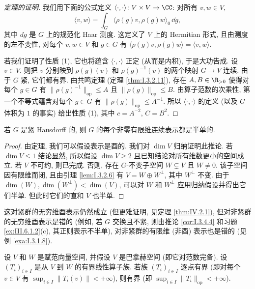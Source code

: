 \begin{proof}[定理的证明]
我们用下面的公式定义 $\langle \cdot, \cdot \rangle \colon V \times V \to \CC$: 对所有 $v, w \in V$,
\[
\langle v, w \rangle = \int_G \langle \rho(g)v, \rho(g)w \rangle_0 \,\dd g,
\]
其中 $dg$ 是 $G$ 上的规范化 Haar 测度. 这定义了 $V$ 上的 Hermitian 形式, 且由测度的左不变性, 对每个 $v, w \in V$ 和 $g \in G$ 有 $\langle \rho(g)v, \rho(g)w \rangle = \langle v, w \rangle$.

若我们证明了性质 (1), 它也将蕴含 $\langle \cdot, \cdot \rangle$ 正定 (从而是内积), 于是大功告成. 设 $v \in V$. 则把 $v$ 分别映到 $\rho(g)(v)$ 和 $\rho(g)^{-1}(v)$ 的两个映射 $G \to V$ 连续. 由于 $G$ 紧, 它们都有界. 由共鸣定理 (定理 \ref{thm:I.3.2.11}), 存在 $A, B \in \R_{>0}$ 使得对每个 $g \in G$ 有 $\|\rho(g)^{-1}\|_{\mathrm{op}} \leq A$ 且 $\|\rho(g)\|_{\mathrm{op}} \leq B$. 由算子范数的次乘性, 第一个不等式蕴含对每个 $g \in G$ 有 $\|\rho(g)\|_{\mathrm{op}} \leq A^{-1}$. 所以 $\langle \cdot, \cdot \rangle$ 的定义 (以及 $G$ 体积为 $1$ 的事实) 给出性质 (1), 其中 $c = A^{-2}$, $C = B^2$.
\end{proof}

\begin{corollary}[紧群的有限维表示半单]
\label{cor:I.3.2.9}
若 $G$ 是紧 Hausdorff 的, 则 $G$ 的每个非零有限维连续表示都是半单的.
\end{corollary}

\begin{proof}
由定理, 我们可以假设表示是酉的. 我们对 $\dim V$ 归纳证明此推论. 若 $\dim V \leq 1$ 结论显然, 所以假设 $\dim V \geq 2$ 且已知结论对所有维数更小的空间成立. 若 $V$ 不可约, 则已完成. 否则, 存在 $G$-不变子空间 $W \subsetneq V$ 且 $W \neq 0$. 该子空间因有限维而闭, 且由引理 \ref{lem:I.3.2.6} 有 $V = W \oplus W^{\perp}$, 其中 $W^{\perp}$ 不变. 由于 $\dim(W), \dim(W^{\perp}) < \dim(V)$, 可以对 $W$ 和 $W^{\perp}$ 应用归纳假设并得出它们半单. 但此时它们的直和 $V$ 也半单.
\end{proof}

\begin{remark}[半单性的进一步讨论]
\label{rem:I.3.2.10}
这对紧群的无穷维酉表示仍然成立 (但更难证明, 见定理 \ref{thm:IV.2.1}), 但对非紧群的无穷维酉表示是错的 (例如, 若 $G$ 交换且不紧, 则由推论 \ref{cor:I.3.4.4} 和习题 \ref{ex:III.6.1.2}(c), 其正则表示不半单), 对非紧群的有限维 (非酉) 表示也是错的 (见例 \ref{exa:I.3.1.8}).
\end{remark}

\begin{theorem}
\label{thm:I.3.2.11}
设 $V$ 和 $W$ 是赋范向量空间, 并假设 $V$ 是巴拿赫空间 (即它对范数完备). 设 $(T_i)_{i \in I}$ 是从 $V$ 到 $W$ 的有界线性算子族.
若族 $(T_i)_{i \in I}$ 逐点有界 (即对每个 $v \in V$ 有 $\sup_{i \in I}\|T_i(v)\| < +\infty$), 则有界 (即 $\sup_{i \in I}\|T_i\|_{\mathrm{op}} < +\infty$).
\end{theorem}

